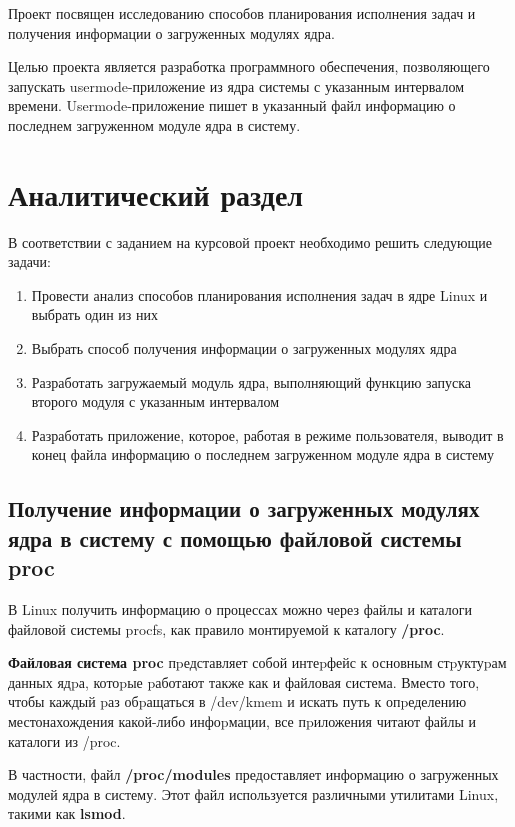 \documentclass[a4paper,14pt]{extarticle}
\begin{document}
 	Проект посвящен исследованию способов планирования исполнения задач и получения информации о загруженных модулях ядра.
 	
 	Целью проекта является разработка программного обеспечения, позволяющего запускать usermode-приложение из ядра системы с указанным интервалом времени. Usermode-приложение пишет в указанный файл информацию о последнем загруженном модуле ядра в систему.
 	
 	\newpage
 	
 	\section{Аналитический раздел}
 	
 	В соответствии с заданием на курсовой проект необходимо решить следующие задачи:
 	
 	\begin{enumerate}
 		\item Провести анализ способов планирования исполнения задач в ядре Linux и выбрать один из них
 		\item Выбрать способ получения информации о загруженных модулях ядра
 		\item Разработать загружаемый модуль ядра, выполняющий функцию запуска второго модуля с указанным интервалом
 		\item Разработать приложение, которое, работая в режиме пользователя, выводит в конец файла информацию о последнем загруженном модуле ядра в систему
 	\end{enumerate}
 	
 	\subsection{Получение информации о загруженных модулях ядра в систему с помощью файловой системы proc}
 	
 	В Linux получить информацию о процессах можно через файлы и каталоги файловой системы procfs, как правило монтируемой к каталогу {\bf /proc}.
 	
 	{\bf Файловая система proc} пpедставляет собой интеpфейс к основным стpуктуpам данных ядpа, котоpые pаботают также как и файловая система. Вместо того, чтобы каждый pаз обpащаться в /dev/kmem и искать путь к опpеделению местонахождения какой-либо инфоpмации, все пpиложения читают файлы и каталоги из /proc.
 	
 	В частности, файл {\bf /proc/modules} предоставляет информацию о загруженных модулей ядра в систему. Этот файл используется различными утилитами Linux, такими как {\bf lsmod}.
 	
\end{document}
